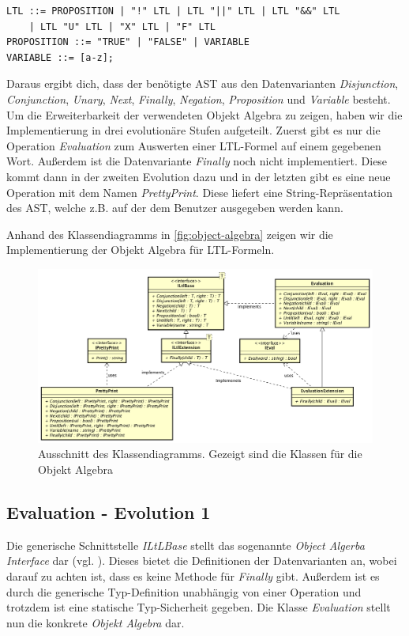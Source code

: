 \documentclass{llncs}
\begin{document}
\begin{lstlisting}
LTL ::= PROPOSITION | "!" LTL | LTL "||" LTL | LTL "&&" LTL
	| LTL "U" LTL | "X" LTL | "F" LTL
PROPOSITION ::= "TRUE" | "FALSE" | VARIABLE
VARIABLE ::= [a-z];
\end{lstlisting}\label{lst:grammar}

Daraus ergibt dich, dass der benötigte AST aus den Datenvarianten \emph{Disjunction}, \emph{Conjunction}, \emph{Unary}, \emph{Next}, \emph{Finally}, \emph{Negation}, \emph{Proposition} und \emph{Variable} besteht.
Um die Erweiterbarkeit der verwendeten Objekt Algebra zu zeigen, haben wir die Implementierung in drei evolutionäre Stufen aufgeteilt.
Zuerst gibt es nur die Operation \emph{Evaluation} zum Auswerten einer LTL-Formel auf einem gegebenen Wort. Außerdem ist die Datenvariante \emph{Finally} noch nicht implementiert.
Diese kommt dann in der zweiten Evolution dazu und in der letzten gibt es eine neue Operation mit dem Namen \emph{PrettyPrint}.
Diese liefert eine String-Repräsentation des AST, welche z.B. auf der dem Benutzer ausgegeben werden kann.

Anhand des Klassendiagramms in \autoref{fig:object-algebra} zeigen wir die Implementierung der Objekt Algebra für LTL-Formeln.

\begin{figure}
	\centering
	\includegraphics[width=\textwidth]{images/ObjectAlgebra.png}
	\caption{Ausschnitt des Klassendiagramms. Gezeigt sind die Klassen für die Objekt Algebra}
	\label{fig:object-algebra}
\end{figure}

\subsection{Evaluation - Evolution 1}
Die generische Schnittstelle \emph{ILtLBase} stellt das sogenannte \emph{Object Algerba Interface} dar (vgl. \cite[Abschnitt 3 S.6]{Oliveira12}).
Dieses bietet die Definitionen der Datenvarianten an, wobei darauf zu achten ist, dass es keine Methode für \emph{Finally} gibt.
Außerdem ist es durch die generische Typ-Definition unabhängig von einer Operation und trotzdem ist eine statische Typ-Sicherheit gegeben.
Die Klasse \emph{Evaluation} stellt nun die konkrete \emph{Objekt Algebra} dar.
\end{document}
